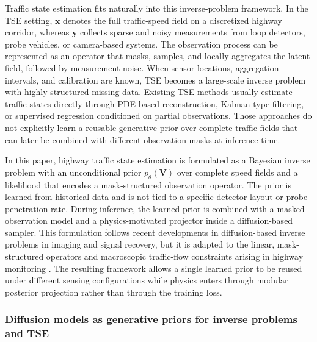 \documentclass[a4paper,fleqn]{cas-sc}
\numberwithin{equation}{section}
\begin{document}
Traffic state estimation fits naturally into this inverse-problem framework. In the TSE setting, $\mathbf{x}$ denotes the full traffic-speed field on a discretized highway corridor, whereas $\mathbf{y}$ collects sparse and noisy measurements from loop detectors, probe vehicles, or camera-based systems. The observation process can be represented as an operator that masks, samples, and locally aggregates the latent field, followed by measurement noise. When sensor locations, aggregation intervals, and calibration are known, TSE becomes a large-scale inverse problem with highly structured missing data. Existing TSE methods usually estimate traffic states directly through PDE-based reconstruction, Kalman-type filtering, or supervised regression conditioned on partial observations. Those approaches do not explicitly learn a reusable generative prior over complete traffic fields that can later be combined with different observation masks at inference time.

In this paper, highway traffic state estimation is formulated as a Bayesian inverse problem with an unconditional prior $p_\theta(\mathbf{V})$ over complete speed fields and a likelihood that encodes a mask-structured observation operator. The prior is learned from historical data and is not tied to a specific detector layout or probe penetration rate. During inference, the learned prior is combined with a masked observation model and a physics-motivated projector inside a diffusion-based sampler. This formulation follows recent developments in diffusion-based inverse problems in imaging and signal recovery, but it is adapted to the linear, mask-structured operators and macroscopic traffic-flow constraints arising in highway monitoring \citep{song2021solving, chung2022score, kawar2022denoising, chung2023diffusion}. The resulting framework allows a single learned prior to be reused under different sensing configurations while physics enters through modular posterior projection rather than through the training loss.

\subsubsection{Diffusion models as generative priors for inverse problems and TSE}
\end{document}
